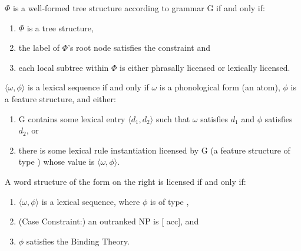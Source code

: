 \documentclass[a4paper,landscape,headrule,footrule]{foils}
\begin{document}
$\Phi$ is a well-formed tree structure according to grammar G
if and only if:
\begin{enumerate}
\item $\Phi$ is a tree structure,
\item the label of $\Phi$'s root node satisfies the constraint
   and
\item each local subtree within $\Phi$ is either phrasally licensed
  or lexically licensed.
\end{enumerate}

$\langle\omega, \phi\rangle$ is a lexical sequence if and only if
$\omega$ is a phonological form (an atom), $\phi$ is a feature
structure, and either:
\begin{enumerate}
\item G contains some lexical entry $\langle d_1, d_2\rangle$
  such that $\omega$ satisfies $d_1$ and $\phi$ satisfies $d_2$, or
\item there is some lexical rule instantiation licensed by G
  (a feature structure of type ) whose 
  value is $\langle\omega, \phi\rangle$.
\end{enumerate}

\begin{minipage}[c]{0.7\textwidth}
A word structure of the form on the right is licensed if and only if:
\begin{enumerate}
\item $\langle\omega, \phi\rangle$ is a lexical sequence, where
  $\phi$ is of type ,
\item (Case Constraint:) an outranked NP is [ acc], and
\item $\phi$ satisfies the Binding Theory.
\end{enumerate}
\end{minipage}%
\begin{minipage}[c]{0.25\textwidth}
\begin{center}
\ctree{[{$\phi$} [{$\omega$}]]}
\end{center}
\end{minipage}
\end{document}
